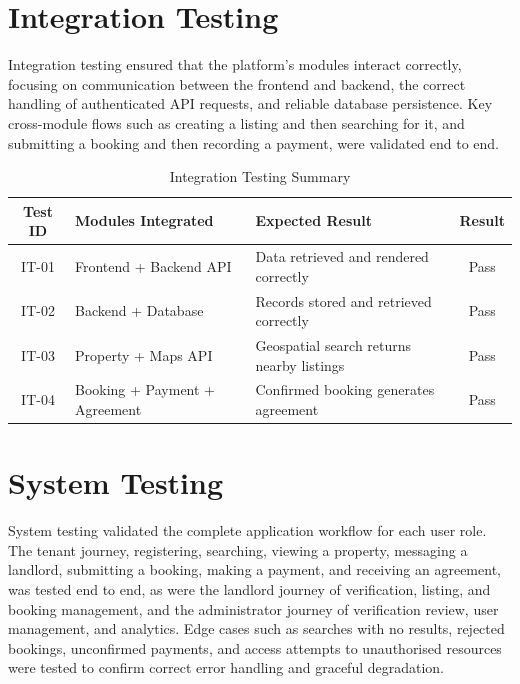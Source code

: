 \section{Integration Testing}

Integration testing ensured that the platform's modules interact correctly, focusing on communication between the frontend and backend, the correct handling of authenticated API requests, and reliable database persistence. Key cross-module flows such as creating a listing and then searching for it, and submitting a booking and then recording a payment, were validated end to end.

\begin{table}[h]
\centering
\caption{Integration Testing Summary}
\begin{tabularx}{\textwidth}{|c|X|X|c|}
\hline
\textbf{Test ID} & \textbf{Modules Integrated} & \textbf{Expected Result} & \textbf{Result} \\
\hline
IT-01 & Frontend + Backend API & Data retrieved and rendered correctly & Pass \\
\hline
IT-02 & Backend + Database & Records stored and retrieved correctly & Pass \\
\hline
IT-03 & Property + Maps API & Geospatial search returns nearby listings & Pass \\
\hline
IT-04 & Booking + Payment + Agreement & Confirmed booking generates agreement & Pass \\
\hline
\end{tabularx}
\end{table}


\section{System Testing}

System testing validated the complete application workflow for each user role. The tenant journey, registering, searching, viewing a property, messaging a landlord, submitting a booking, making a payment, and receiving an agreement, was tested end to end, as were the landlord journey of verification, listing, and booking management, and the administrator journey of verification review, user management, and analytics. Edge cases such as searches with no results, rejected bookings, unconfirmed payments, and access attempts to unauthorised resources were tested to confirm correct error handling and graceful degradation.

